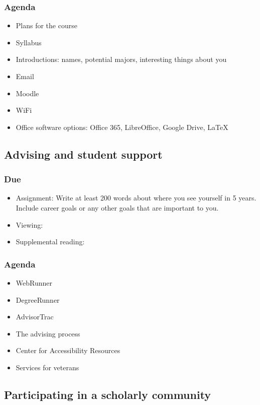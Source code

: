 \documentclass[12pt,article,oneside]{memoir}
\begin{document}
\subsubsection{Agenda}
\begin{itemize}
 \item Plans for the course
 \item Syllabus
 \item Introductions: names, potential majors, interesting things about you
 \item Email
 \item Moodle
 \item WiFi
 \item Office software options: Office 365, LibreOffice, Google Drive, \LaTeX
\end{itemize}


\subsection{Advising and student support}
\subsubsection{Due}
\begin{itemize}
 \item Assignment: Write at least 200 words about where you see yourself in 5 years.  Include career goals or any other goals that are important to you.
 \item Viewing: \cite{credits}
 \item Supplemental reading: 
\end{itemize}

\subsubsection{Agenda}
\begin{itemize}
\item WebRunner
\item DegreeRunner
\item AdvisorTrac
\item The advising process
\item Center for Accessibility Resources
\item Services for veterans

\end{itemize} 



\subsection{Participating in a scholarly community}
\end{document}
